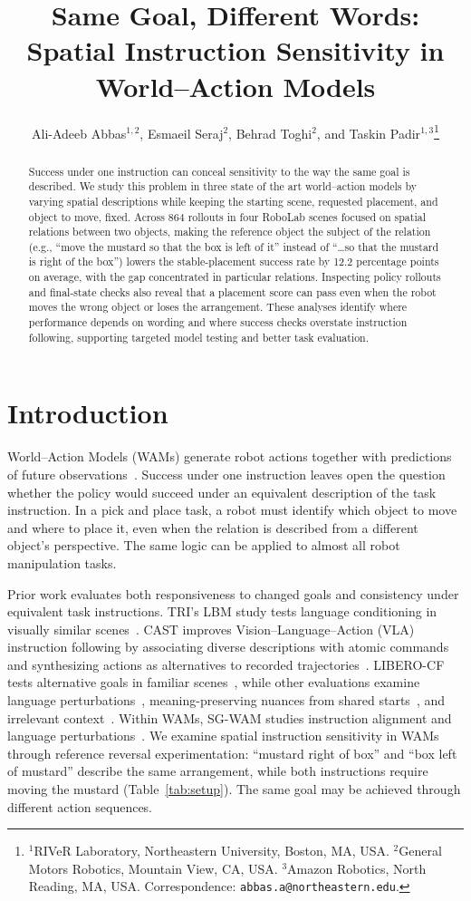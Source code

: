 \documentclass{article}
\title{Same Goal, Different Words:\\Spatial Instruction Sensitivity in World--Action Models}
\author{Ali-Adeeb Abbas$^{1,2}$, Esmaeil Seraj$^2$, Behrad Toghi$^2$, and Taskin Padir$^{1,3}$\thanks{$^1$RIVeR Laboratory, Northeastern University, Boston, MA, USA. $^2$General Motors Robotics, Mountain View, CA, USA. $^3$Amazon Robotics, North Reading, MA, USA. Correspondence: \texttt{abbas.a@northeastern.edu}.}}
\begin{document}
\maketitle
\begin{abstract}
Success under one instruction can conceal sensitivity to the way the same goal is described. We study this problem in three state of the art world--action models by varying spatial descriptions while keeping the starting scene, requested placement, and object to move, fixed. Across 864 rollouts in four RoboLab scenes focused on spatial relations between two objects, making the reference object the subject of the relation (e.g., ``move the mustard so that the box is left of it'' instead of ``\ldots so that the mustard is right of the box'') lowers the stable-placement success rate by 12.2 percentage points on average, with the gap concentrated in particular relations. Inspecting policy rollouts and final-state checks also reveal that a placement score can pass even when the robot moves the wrong object or loses the arrangement. These analyses identify where performance depends on wording and where success checks overstate instruction following, supporting targeted model testing and better task evaluation.
\end{abstract}

\section{Introduction}
World--Action Models (WAMs) generate robot actions together with predictions of future observations~\citep{kim2026cosmospolicy}. Success under one instruction leaves open the question whether the policy would succeed under an equivalent description of the task instruction. In a pick and place task, a robot must identify which object to move and where to place it, even when the relation is described from a different object's perspective. The same logic can be applied to almost all robot manipulation tasks.

Prior work evaluates both responsiveness to changed goals and consistency under equivalent task instructions. TRI's LBM study tests language conditioning in visually similar scenes~\citep{tri2025lbm}. CAST improves Vision--Language--Action (VLA) instruction following by associating diverse descriptions with atomic commands and synthesizing actions as alternatives to recorded trajectories~\citep{glossop2025cast}. LIBERO-CF tests alternative goals in familiar scenes~\citep{fang2026counterfactual}, while other evaluations examine language perturbations~\citep{fei2026liberoplus}, meaning-preserving nuances from shared starts~\citep{kim2026liberopara}, and irrelevant context~\citep{moskalenko2026bring}. Within WAMs, SG-WAM studies instruction alignment and language perturbations~\citep{he2026sgwam}. We examine spatial instruction sensitivity in WAMs through reference reversal experimentation: ``mustard right of box'' and ``box left of mustard'' describe the same arrangement, while both instructions require moving the mustard (Table~\ref{tab:setup}). The same goal may be achieved through different action sequences.
\end{document}
